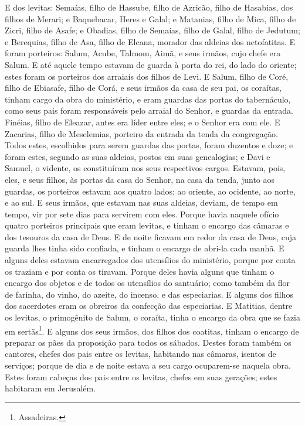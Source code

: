 E dos levitas: Semaías, filho de Hassube, filho de Azricão, filho
de Hasabias, dos filhos de Merari; e Baquebacar, Heres e
Galal; e Matanias, filho de Mica, filho de Zicri, filho de Asafe;
e Obadias, filho de Semaías, filho de Galal, filho de
Jedutum; e Berequias, filho de Asa, filho de Elcana, morador das
aldeias dos netofatitas. E foram porteiros: Salum, Acube,
Talmom, Aimã, e seus irmãos, cujo chefe era Salum. E até
aquele tempo estavam de guarda à porta do rei, do lado do oriente;
estes foram os porteiros dos arraiais dos filhos de Levi. E
Salum, filho de Coré, filho de Ebiasafe, filho de Corá, e seus
irmãos da casa de seu pai, os coraítas, tinham cargo da obra do
ministério, e eram guardas das portas do tabernáculo, como seus pais
foram responsáveis pelo arraial do Senhor, e guardas da entrada.
Finéias, filho de Eleazar, antes era líder entre eles; e o
Senhor era com ele. E Zacarias, filho de Meselemias, porteiro
da entrada da tenda da congregação. Todos estes, escolhidos
para serem guardas das portas, foram duzentos e doze; e foram estes,
segundo as suas aldeias, postos em suas genealogias; e Davi e
Samuel, o vidente, os constituíram nos seus respectivos cargos.
Estavam, pois, eles, e seus filhos, às portas da casa do
Senhor, na casa da tenda, junto aos guardas, os porteiros
estavam aos quatro lados; ao oriente, ao ocidente, ao norte, e ao
sul. E seus irmãos, que estavam nas suas aldeias, deviam, de
tempo em tempo, vir por sete dias para servirem com eles.
Porque havia naquele ofício quatro porteiros principais que
eram levitas, e tinham o encargo das câmaras e dos tesouros da casa
de Deus. E de noite ficavam em redor da casa de Deus, cuja
guarda lhes tinha sido confiada, e tinham o encargo de abri-la cada
manhã. E alguns deles estavam encarregados dos utensílios do
ministério, porque por conta os traziam e por conta os tiravam.
Porque deles havia alguns que tinham o encargo dos objetos e
de todos os utensílios do santuário; como também da flor de farinha,
do vinho, do azeite, do incenso, e das especiarias. E alguns
dos filhos dos sacerdotes eram os obreiros da confecção das
especiarias. E Matitias, dentre os levitas, o primogênito de
Salum, o coraíta, tinha o encargo da obra que se fazia em
sertãs\footnote{Assadeiras.}. E alguns dos seus irmãos, dos
filhos dos coatitas, tinham o encargo de preparar os pães da
proposição para todos os sábados. Destes foram também os
cantores, chefes dos pais entre os levitas, habitando nas câmaras,
isentos de serviços; porque de dia e de noite estava a seu cargo
ocuparem-se naquela obra. Estes foram cabeças dos pais entre
os levitas, chefes em suas gerações; estes habitaram em Jerusalém.

